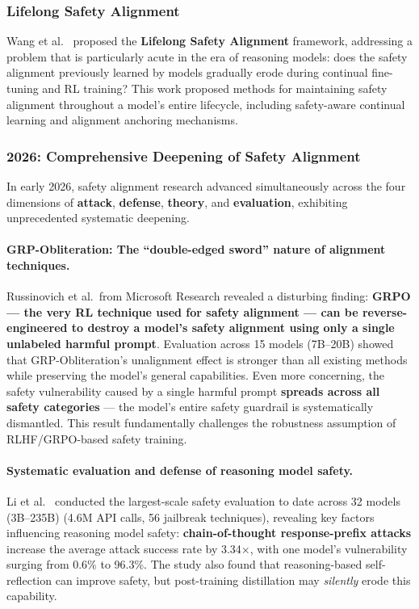 \subsubsection{Lifelong Safety Alignment}

Wang et al.\ \cite{wang2025lifelongsafety} proposed the \textbf{Lifelong Safety Alignment} framework,
addressing a problem that is particularly acute in the era of reasoning models:
does the safety alignment previously learned by models gradually erode
during continual fine-tuning and RL training?
This work proposed methods for maintaining safety alignment throughout a model's entire lifecycle,
including safety-aware continual learning and alignment anchoring mechanisms.

\subsubsection{2026: Comprehensive Deepening of Safety Alignment}

In early 2026, safety alignment research advanced simultaneously across the four dimensions of \textbf{attack}, \textbf{defense}, \textbf{theory}, and \textbf{evaluation},
exhibiting unprecedented systematic deepening.

\paragraph{GRP-Obliteration: The ``double-edged sword'' nature of alignment techniques.}
Russinovich et al.\ from Microsoft Research revealed a disturbing finding:
\textbf{GRPO --- the very RL technique used for safety alignment ---
can be reverse-engineered to destroy a model's safety alignment using only a single unlabeled harmful prompt}.
Evaluation across 15 models (7B--20B) showed that
GRP-Obliteration's unalignment effect is stronger than all existing methods
while preserving the model's general capabilities.
Even more concerning, the safety vulnerability caused by a single harmful prompt
\textbf{spreads across all safety categories} ---
the model's entire safety guardrail is systematically dismantled.
This result fundamentally challenges the robustness assumption of RLHF/GRPO-based safety training.

\paragraph{Systematic evaluation and defense of reasoning model safety.}
Li et al.\ \cite{li2026whatmatters} conducted the largest-scale safety evaluation to date
across 32 models (3B--235B) (4.6M API calls, 56 jailbreak techniques),
revealing key factors influencing reasoning model safety:
\textbf{chain-of-thought response-prefix attacks}
increase the average attack success rate by 3.34$\times$,
with one model's vulnerability surging from 0.6\% to 96.3\%.
The study also found that reasoning-based self-reflection can improve safety,
but post-training distillation may \emph{silently} erode this capability.


